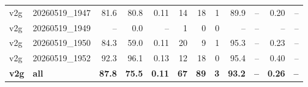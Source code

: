 \begin{table}[t]
\begin{tabular}{llrrrrrrrrrr}
v2g & 20260519\_1947 & 81.6 & 80.8 & 0.11 & 14 & 18 & 1 & 89.9 & -- & 0.20 & -- \\
v2g & 20260519\_1949 & -- & 0.0 & -- & 1 & 0 & 0 & -- & -- & -- & -- \\
v2g & 20260519\_1950 & 84.3 & 59.0 & 0.11 & 20 & 9 & 1 & 95.3 & -- & 0.23 & -- \\
v2g & 20260519\_1952 & 92.3 & 96.1 & 0.13 & 12 & 18 & 0 & 95.4 & -- & 0.40 & -- \\
\textbf{v2g} & \textbf{all} & \textbf{87.8} & \textbf{75.5} & \textbf{0.11} & \textbf{67} & \textbf{89} & \textbf{3} & \textbf{93.2} & \textbf{--} & \textbf{0.26} & \textbf{--} \\
\bottomrule
\end{tabular}
\end{table}
